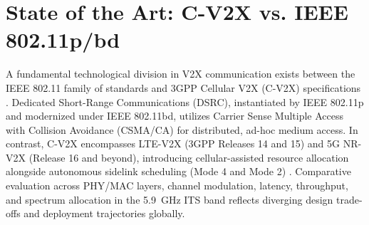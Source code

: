 \section{State of the Art: C-V2X vs. IEEE 802.11p/bd}
\label{sec:state_of_the_art}

A fundamental technological division in V2X communication exists between the IEEE 802.11 family of standards and 3GPP Cellular V2X (C-V2X) specifications \cite{naik2019ieee}.
Dedicated Short-Range Communications (DSRC), instantiated by IEEE 802.11p and modernized under IEEE 802.11bd, utilizes Carrier Sense Multiple Access with Collision Avoidance (CSMA/CA) for distributed, ad-hoc medium access.
In contrast, C-V2X encompasses LTE-V2X (3GPP Releases 14 and 15) and 5G NR-V2X (Release 16 and beyond), introducing cellular-assisted resource allocation alongside autonomous sidelink scheduling (Mode 4 and Mode 2) \cite{sudirham2023sdn}.
Comparative evaluation across PHY/MAC layers, channel modulation, latency, throughput, and spectrum allocation in the 5.9~GHz ITS band reflects diverging design trade-offs and deployment trajectories globally.

